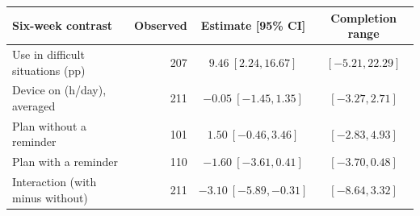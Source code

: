 \begin{tabularx}{\linewidth}{@{}Xrcc@{}}\toprule
Six-week contrast & Observed & Estimate [95\% CI] & Completion range\\\midrule
Use in difficult situations (pp) & 207 & $9.46\ [2.24,16.67]$ & $[-5.21,22.29]$\\
Device on (h/day), averaged & 211 & $-0.05\ [-1.45,1.35]$ & $[-3.27,2.71]$\\
\quad Plan without a reminder & 101 & $1.50\ [-0.46,3.46]$ & $[-2.83,4.93]$\\
\quad Plan with a reminder & 110 & $-1.60\ [-3.61,0.41]$ & $[-3.70,0.48]$\\
\quad Interaction (with minus without) & 211 & $-3.10\ [-5.89,-0.31]$ & $[-8.64,3.32]$\\
\bottomrule
\end{tabularx}
